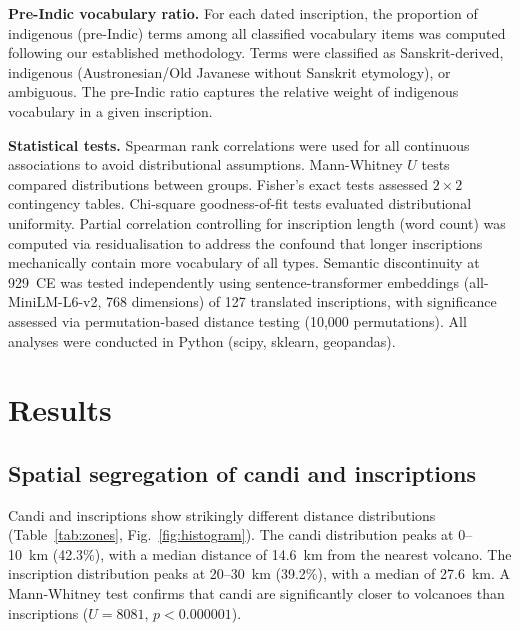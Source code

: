 \documentclass[12pt]{article}
\begin{document}
\textbf{Pre-Indic vocabulary ratio.} For each dated inscription, the proportion of indigenous (pre-Indic) terms among all classified vocabulary items was computed following our established methodology.
Terms were classified as Sanskrit-derived, indigenous (Austronesian/Old Javanese without Sanskrit etymology), or ambiguous.
The pre-Indic ratio captures the relative weight of indigenous vocabulary in a given inscription.

\textbf{Statistical tests.} Spearman rank correlations were used for all continuous associations to avoid distributional assumptions.
Mann-Whitney $U$ tests compared distributions between groups.
Fisher's exact tests assessed $2 \times 2$ contingency tables.
Chi-square goodness-of-fit tests evaluated distributional uniformity.
Partial correlation controlling for inscription length (word count) was computed via residualisation to address the confound that longer inscriptions mechanically contain more vocabulary of all types.
Semantic discontinuity at 929~CE was tested independently using sentence-transformer embeddings (all-MiniLM-L6-v2, 768 dimensions) of 127 translated inscriptions, with significance assessed via permutation-based distance testing (10,000 permutations).
All analyses were conducted in Python (scipy, sklearn, geopandas).


\section{Results}

\subsection{Spatial segregation of candi and inscriptions}

Candi and inscriptions show strikingly different distance distributions (Table~\ref{tab:zones}, Fig.~\ref{fig:histogram}).
The candi distribution peaks at 0--10~km (42.3\%), with a median distance of 14.6~km from the nearest volcano.
The inscription distribution peaks at 20--30~km (39.2\%), with a median of 27.6~km.
A Mann-Whitney test confirms that candi are significantly closer to volcanoes than inscriptions ($U = 8081$, $p < 0.000001$).
\end{document}
